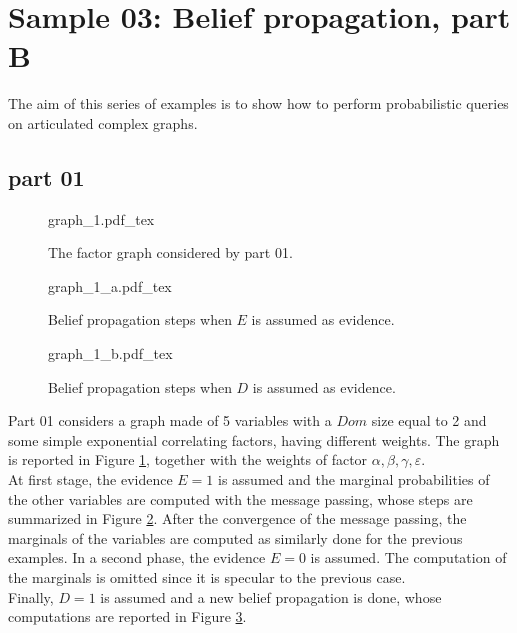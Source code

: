 
\section{Sample 03: Belief propagation, part B}

The aim of this series of examples is to show how to perform probabilistic queries on articulated complex graphs.

\subsection{part 01}

\begin{figure}
	\centering
\def\svgwidth{0.5 \textwidth}
{graph_1.pdf_tex} 
\caption{The factor graph considered by part 01.}
\label{fig:sample_03:0}
\end{figure}

\begin{figure}
	\centering
\def\svgwidth{0.6 \textwidth}
{graph_1_a.pdf_tex} 
\caption{Belief propagation steps when $E$ is assumed as evidence.}
\label{fig:sample_03:1}
\end{figure}

\begin{figure}
	\centering
\def\svgwidth{0.6 \textwidth}
{graph_1_b.pdf_tex} 
\caption{Belief propagation steps when $D$ is assumed as evidence.}
\label{fig:sample_03:2}
\end{figure}

Part 01 considers a graph made of 5 variables with a $Dom$ size equal to 2 and some simple exponential correlating factors, having different weights.
The graph is reported in Figure \ref{fig:sample_03:0}, together with the weights of factor $\alpha, \beta, \gamma, \varepsilon$.
\\
At first stage, the evidence $E=1$ is assumed and the marginal probabilities of the other variables are computed with the message passing, whose steps are summarized in Figure \ref{fig:sample_03:1}. After the convergence of the message passing, the marginals of the variables are computed as similarly done for the previous examples.
In a second phase, the evidence  $E=0$ is assumed. The computation of the marginals is omitted since it is specular to the previous case. 
\\
Finally, $D=1$ is assumed and a new belief propagation is done, whose computations are reported in Figure \ref{fig:sample_03:2}.

